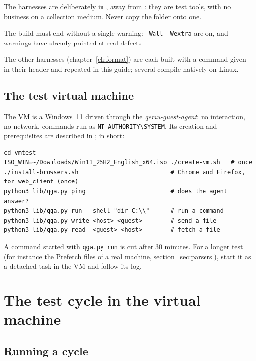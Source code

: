 \documentclass[11pt,a4paper,oneside]{report}
\begin{document}
\begin{attention}
The harnesses are deliberately in , away from
: they are test tools, with no business on a collection
medium. Never copy the  folder onto one.
\end{attention}

The build must end without a single warning: \texttt{-Wall -Wextra} are on, and
warnings have already pointed at real defects.

The other harnesses (chapter~\ref{ch:format}) are each built with a command given
in their header and repeated in this guide; several compile natively on Linux.

\section{The test virtual machine}

The VM is a Windows~11 driven through the \emph{qemu-guest-agent}: no
interaction, no network, commands run as
\texttt{NT AUTHORITY\textbackslash SYSTEM}. Its creation and prerequisites are
described in ; in short:

\begin{lstlisting}
cd vmtest
ISO_WIN=~/Downloads/Win11_25H2_English_x64.iso ./create-vm.sh   # once
./install-browsers.sh                          # Chrome and Firefox, for web_client (once)
python3 lib/qga.py ping                        # does the agent answer?
python3 lib/qga.py run --shell "dir C:\\"      # run a command
python3 lib/qga.py write <host> <guest>        # send a file
python3 lib/qga.py read  <guest> <host>        # fetch a file
\end{lstlisting}

\begin{note}
A command started with \texttt{qga.py run} is cut after 30 minutes. For a longer
test (for instance the Prefetch files of a real machine,
section~\ref{sec:parsers}), start it as a detached task in the VM and follow its
log.
\end{note}

\chapter{The test cycle in the virtual machine}\label{ch:vm}

\section{Running a cycle}
\end{document}
